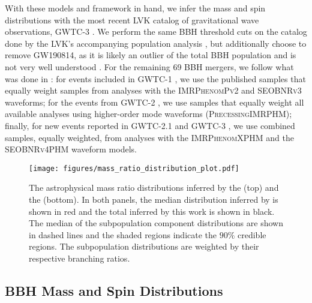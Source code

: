 With these models and framework in hand, we infer the mass and spin distributions with the most recent LVK catalog of gravitational wave observations, GWTC-3 \citep{2021arXiv211103606T}. We perform the same BBH threshold cuts on the catalog done by the LVK's accompanying population analysis \othreea{}, but additionally choose to remove GW190814, as it is likely an outlier of the total BBH population and is not very well understood \citep{2010.14533,2111.03634, 2109.00418}. For the remaining 69 BBH mergers, we follow what was done in \citet{2021arXiv211103606T}: for events included in GWTC-1 \citep{2019ApJ...882L..24A}, we use the published samples that equally weight samples from analyses with the \textsc{IMRPhenomPv2} \citep{1308.3271} and \textsc{SEOBNRv3} \citep{1307.6232,1311.2544} waveforms; for the events from GWTC-2 \citep{2021ApJ...913L...7A}, we use samples that equally weight all available analyses using higher-order mode waveforms (\textsc{PrecessingIMRPHM}); finally, for new events reported in GWTC-2.1 and GWTC-3 \citep{2021arXiv211103606T,2108.01045}, we use combined samples, equally weighted, from analyses with the \textsc{IMRPhenomXPHM} \citep{2004.06503} and the \textsc{SEOBNRv4PHM} \citep{2004.09442} waveform models.

\begin{figure}[ht!]
    \begin{centering}
        \texttt{[image: figures/mass\_ratio\_distribution\_plot.pdf]}
        \caption{The astrophysical mass ratio distributions inferred by the \base{} (top) and the \comp{} (bottom). In both panels, the median distribution inferred by \brucepaper is shown in red and the total inferred by this work is shown in black. The median of the subpopulation component distributions are shown in dashed lines and the shaded regions indicate the $90\%$ credible regions. The subpopulation distributions are weighted by their respective branching ratios.}
        \label{fig:mass_ratio_distribution}
    \end{centering}
\end{figure}

\subsection{BBH Mass and Spin Distributions}


